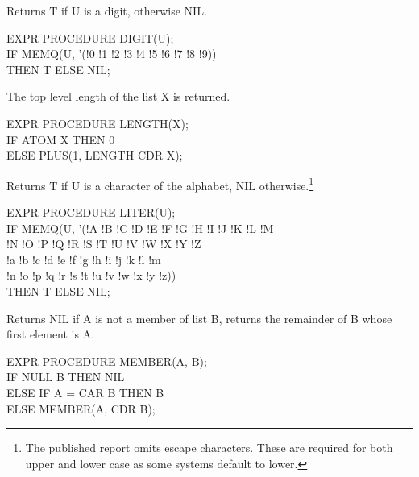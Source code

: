 {Returns T if U is a digit, otherwise NIL.

{\tt \begin{tabbing} EXPR PROCEDURE DIGIT(U); \\
\hspace*{1em} IF MEMQ(U, '(!0 !1 !2 !3 !4 !5 !6 !7 !8 !9)) \\
\hspace*{2em} THEN T ELSE NIL;
\end{tabbing}}}

{The top level length of the list X is returned.

{\tt \begin{tabbing} EXPR PROCEDURE LENGTH(X); \\
\hspace*{1em} IF ATOM X THEN 0 \\
\hspace*{2em} ELSE PLUS(1, LENGTH CDR X);
\end{tabbing}}}

{Returns T if U is a character of the alphabet, NIL
otherwise.\footnote{The published report omits escape characters.
These are required for both upper and lower case as some systems
default to lower.}

{\tt \begin{tabbing} EXPR PROCEDURE LITER(U); \\
\hspace*{1em} IF \= MEMQ(U, '(\=!A !B !C !D !E !F !G !H !I !J !K !L !M \\
\> \> !N !O !P !Q !R !S !T !U !V !W !X !Y !Z \\
\> \> !a !b !c !d !e !f !g !h !i !j !k !l !m \\
\> \> !n !o !p !q !r !s !t !u !v !w !x !y !z)) \\
\> THEN T ELSE NIL;
\end{tabbing}}}

{Returns NIL if A is not a member of list B, returns the remainder of
B whose first element is A. 

{\tt \begin{tabbing} EXPR PROCEDURE MEMBER(A, B); \\
\hspace*{1em} IF NULL B THEN NIL \\
\hspace*{2em} ELSE IF A = CAR B THEN B \\
\hspace*{2em} ELSE MEMBER(A, CDR B);
\end{tabbing}}}


